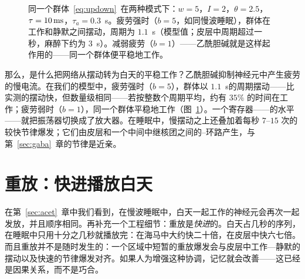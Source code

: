\begin{figure}[t]
\centering
{}
\caption{同一个群体~\eqref{eq:updown}~在两种模式下：$w=5$，$I=2$，$\theta=2.5$，$\tau=10\,\text{ms}$，$\tau_a=0.3$~s。疲劳强时（$b=5$，如同慢波睡眠），群体在工作和静默之间摆动，周期为 $1.1$~s（模型值；皮层中周期超过一秒，麻醉下约为 $3$~s）。减弱疲劳（$b=1$）——乙酰胆碱就是这样起作用的——同一个群体便平稳地工作。}
\label{fig:updown}
\end{figure}

那么，是什么把网络从摆动转为白天的平稳工作？乙酰胆碱抑制神经元中产生疲劳的慢电流\cite{McCormick1992}。在我们的模型中，疲劳强时（$b=5$），群体以 $1.1$~s的周期摆动——比实测的摆动快，但数量级相同——若按整数个周期平均，约有 $35\%$ 的时间在工作；疲劳弱时（$b=1$），同一个群体平稳地工作（图~\ref{fig:updown}）。一个寄存器——的水平——就把振荡器切换成了放大器。在睡眠中，慢摆动之上还叠加着每秒 $7$--$15$ 次的较快节律爆发；它们由皮层和一个中间中继核团之间的--环路产生\cite{SteriadeMcCormickSejnowski1993}，与第~\ref{sec:gaba}~章的节律是近亲。

\section{重放：快进播放白天}

在第~\ref{sec:acet}~章中我们看到，在慢波睡眠中，白天一起工作的神经元会再次一起发放，并且顺序相同。再补充一个工程细节：重放是\emph{快进}的。白天占几秒的序列，在睡眠中只用十分之几秒就播放完\cite{Nadasdy1999}：在海马中大约快二十倍\cite{LeeWilson2002}，在皮层中快六七倍\cite{Euston2007}。而且重放并不是随时发生的：一个区域中短暂的重放爆发会与皮层中工作—静默的摆动以及快速的节律爆发对齐。如果人为增强这种协调，记忆就会改善\cite{Maingret2016}——这已经是因果关系，而不是巧合。

